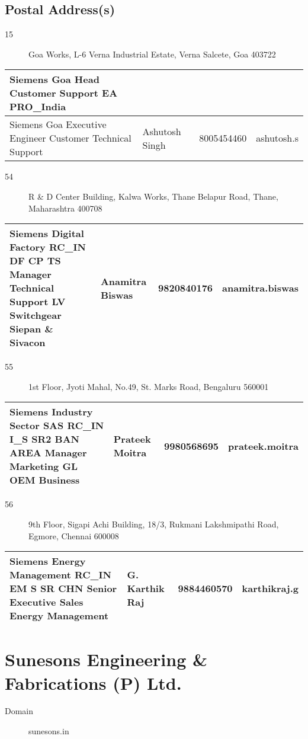 \documentclass[a4paper, 11pt, twoside]{book}
\begin{document}
\subsection*{Postal Address(s)}
\begin{description}
\item [15]Goa Works, L-6 Verna Industrial Estate, Verna Salcete, Goa 403722
\end{description}
\begin{tabular}{|p{4cm}|p{2cm}|p{2cm}|p{3cm}|}
\hline
Siemens Goa Head Customer Support EA PRO\_India & & &  \\ \hline
Siemens Goa Executive Engineer Customer Technical Support & Ashutosh Singh & 8005454460 & ashutosh.s \\ \hline
\end{tabular}
\begin{description}
\item [54]R \& D Center Building, Kalwa Works, Thane Belapur Road, Thane, Maharashtra 400708
\end{description}
\begin{tabular}{|p{4cm}|p{2cm}|p{2cm}|p{3cm}|}
\hline
Siemens Digital Factory RC\_IN DF CP TS Manager Technical Support LV Switchgear Siepan \& Sivacon & Anamitra Biswas & 9820840176 & anamitra.biswas \\ \hline
\end{tabular}
\begin{description}
\item [55]1st Floor, Jyoti Mahal, No.49, St. Marks Road, Bengaluru 560001
\end{description}
\begin{tabular}{|p{4cm}|p{2cm}|p{2cm}|p{3cm}|}
\hline
Siemens Industry Sector SAS RC\_IN I\_S SR2 BAN AREA Manager Marketing GL OEM Business & Prateek Moitra & 9980568695 & prateek.moitra \\ \hline
\end{tabular}
\begin{description}
\item [56]9th Floor, Sigapi Achi Building, 18/3, Rukmani Lakshmipathi Road, Egmore, Chennai 600008
\end{description}
\begin{tabular}{|p{4cm}|p{2cm}|p{2cm}|p{3cm}|}
\hline
Siemens Energy Management RC\_IN EM S SR CHN Senior Executive Sales Energy Management & G. Karthik Raj & 9884460570 & karthikraj.g \\ \hline
\end{tabular}
\section{Sunesons Engineering \& Fabrications (P) Ltd.}\label{com:29}
\begin{description}
\item[Domain]sunesons.in
\end{description}
\end{document}

